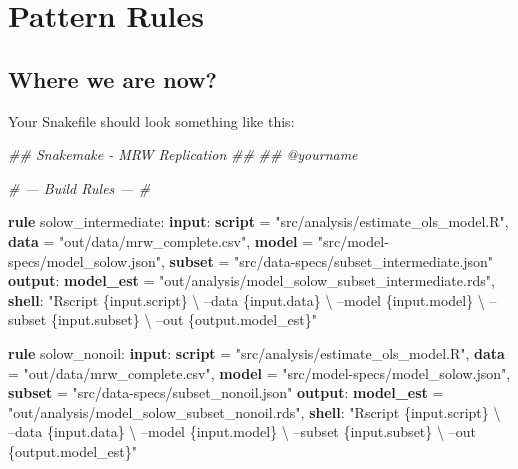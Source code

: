 \documentclass[]{book}
\newenvironment{Shaded}{\begin{snugshade}}{\end{snugshade}}
\newcommand{\KeywordTok}[1]{\textcolor[rgb]{0.13,0.29,0.53}{\textbf{{#1}}}}
\newcommand{\StringTok}[1]{\textcolor[rgb]{0.31,0.60,0.02}{{#1}}}
\newcommand{\CommentTok}[1]{\textcolor[rgb]{0.56,0.35,0.01}{\textit{{#1}}}}
\newcommand{\NormalTok}[1]{{#1}}
\theoremstyle{definition}
\theoremstyle{definition}
\theoremstyle{definition}
\theoremstyle{remark}
\begin{document}
\chapter{Pattern Rules}\label{pattern-rules}

\section{Where we are now?}\label{where-we-are-now}

Your Snakefile should look something like this:

\begin{Shaded}
\begin{Highlighting}[]
\CommentTok{## Snakemake - MRW Replication}
\CommentTok{##}
\CommentTok{## @yourname}


\CommentTok{# --- Build Rules --- #}

\KeywordTok{rule} \NormalTok{solow_intermediate:}
    \KeywordTok{input}\NormalTok{:}
        \KeywordTok{script} \NormalTok{= }\StringTok{"src/analysis/estimate_ols_model.R"}\NormalTok{,}
        \KeywordTok{data}   \NormalTok{= }\StringTok{"out/data/mrw_complete.csv"}\NormalTok{,}
        \KeywordTok{model}  \NormalTok{= }\StringTok{"src/model-specs/model_solow.json"}\NormalTok{,}
        \KeywordTok{subset} \NormalTok{= }\StringTok{"src/data-specs/subset_intermediate.json"}
    \KeywordTok{output}\NormalTok{:}
        \KeywordTok{model_est} \NormalTok{= }\StringTok{"out/analysis/model_solow_subset_intermediate.rds"}\NormalTok{,}
    \KeywordTok{shell}\NormalTok{:}
        \StringTok{"Rscript \{input.script\} \textbackslash{}}
\StringTok{            --data \{input.data\} \textbackslash{}}
\StringTok{            --model \{input.model\} \textbackslash{}}
\StringTok{            --subset \{input.subset\} \textbackslash{}}
\StringTok{            --out \{output.model_est\}"}

\KeywordTok{rule} \NormalTok{solow_nonoil:}
    \KeywordTok{input}\NormalTok{:}
        \KeywordTok{script} \NormalTok{= }\StringTok{"src/analysis/estimate_ols_model.R"}\NormalTok{,}
        \KeywordTok{data}   \NormalTok{= }\StringTok{"out/data/mrw_complete.csv"}\NormalTok{,}
        \KeywordTok{model}  \NormalTok{= }\StringTok{"src/model-specs/model_solow.json"}\NormalTok{,}
        \KeywordTok{subset} \NormalTok{= }\StringTok{"src/data-specs/subset_nonoil.json"}
    \KeywordTok{output}\NormalTok{:}
        \KeywordTok{model_est} \NormalTok{= }\StringTok{"out/analysis/model_solow_subset_nonoil.rds"}\NormalTok{,}
    \KeywordTok{shell}\NormalTok{:}
        \StringTok{"Rscript \{input.script\} \textbackslash{}}
\StringTok{            --data \{input.data\} \textbackslash{}}
\StringTok{            --model \{input.model\} \textbackslash{}}
\StringTok{            --subset \{input.subset\} \textbackslash{}}
\StringTok{            --out \{output.model_est\}"}


\end{Highlighting}
\end{Shaded}
\end{document}
